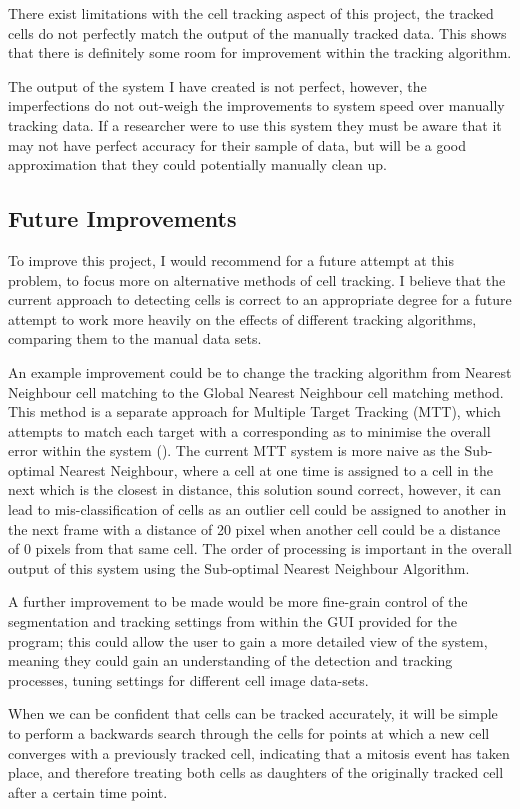 \documentclass[12pt a4paper]{article}
\begin{document}
There exist limitations with the cell tracking aspect of this project, the tracked cells do not perfectly match the output of the manually tracked data. This shows that there is definitely some room for improvement within the tracking algorithm. 

The output of the system I have created is not perfect, however, the imperfections do not out-weigh the improvements to system speed over manually tracking data. If a researcher were to use this system they must be aware that it may not have perfect accuracy for their sample of data, but will be a good approximation that they could potentially manually clean up.
\subsection{Future Improvements}
To improve this project, I would recommend for a future attempt at this problem, to focus more on alternative methods of cell tracking. I believe that the current approach to detecting cells is correct to an appropriate degree for a future attempt to work more heavily on the effects of different tracking algorithms, comparing them to the manual data sets. 

An example improvement could be to change the tracking algorithm from Nearest Neighbour cell matching to the Global Nearest Neighbour cell matching method. This method is a separate approach for Multiple Target Tracking (MTT), which attempts to match each target with a corresponding as to minimise the overall error within the system (\cite{konstantinova2003study}). The current MTT system is more naive as the Sub-optimal Nearest Neighbour, where a cell at one time is assigned to a cell in the next which is the closest in distance, this solution sound correct, however, it can lead to mis-classification of cells as an outlier cell could be assigned to another in the next frame with a distance of 20 pixel when another cell could be a distance of 0 pixels from that same cell. The order of processing is important in the overall output of this system using the Sub-optimal Nearest Neighbour Algorithm.

A further improvement to be made would be more fine-grain control of the segmentation and tracking settings from within the GUI provided for the program; this could allow the user to gain a more detailed view of the system, meaning they could gain an understanding of the detection and tracking processes, tuning settings for different cell image data-sets.

When we can be confident that cells can be tracked accurately, it will be simple to perform a backwards search through the cells for points at which a new cell converges with a previously tracked cell, indicating that a mitosis event has taken place, and therefore treating both cells as daughters of the originally tracked cell after a certain time point.
\newpage
\end{document}
